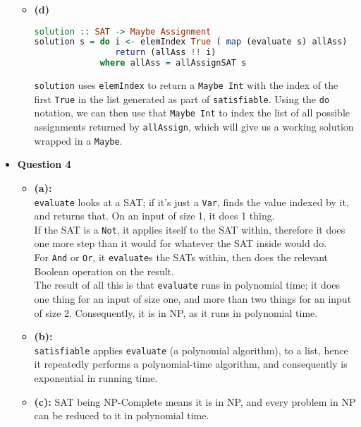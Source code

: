 \documentclass[12pt]{article}
\begin{document}
\begin{itemize}
\begin{itemize}
      \item \textbf{(d)}
        \begin{lstlisting}[language=Haskell]
solution :: SAT -> Maybe Assignment
solution s = do i <- elemIndex True ( map (evaluate s) allAss)
                return (allAss !! i)
             where allAss = allAssignSAT s
        \end{lstlisting}
        \verb|solution| uses \verb|elemIndex| to return a \verb|Maybe Int| with the index of the first \verb|True| in the list
        generated as part of \verb|satisfiable|. Using the \verb|do| notation, we can then use that \verb|Maybe Int| to index the list of
        all possible assignments returned by \verb|allAssign|, which will give us a working solution wrapped in a \verb|Maybe|.
    \end{itemize}

    \pagebreak
  \item \textbf{Question 4}
    \begin{itemize}
      \item \textbf{(a):}\\
        \verb|evaluate| looks at a SAT; if it's just a \verb|Var|, finds the value indexed by it, and returns that. On
        an input of size 1, it does 1 thing.\\
        If the SAT is a \verb|Not|, it applies itself to the SAT within, therefore it does one more step than it would
        for whatever the SAT inside would do.\\
        For \verb|And| or \verb|Or|, it \verb|evaluate|s the SATs within, then does the relevant Boolean operation on
        the result.\\
        The result of all this is that \verb|evaluate| runs in polynomial time; it does one thing for an input of size
        one, and more than two things for an input of size 2. Consequently, it is in NP, as it runs in polynomial time.
      \item \textbf{(b):}\\
        \verb|satisfiable| applies \verb|evaluate| (a polynomial algorithm), to a list, hence it repeatedly performs a
        polynomial-time algorithm, and consequently is exponential in running time.
      \item \textbf{(c):} SAT being NP-Complete means it is in NP, and every problem in NP can be reduced to it in
        polynomial time. 
    \end{itemize}
\end{itemize}
\end{document}
